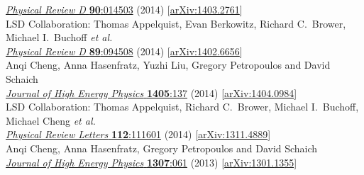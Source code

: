 \begin{spacelist}
\begin{revnumerate}
      \href{http://dx.doi.org/10.1103/PhysRevD.90.014503}{\textit{Physical Review D} \textbf{90}:014503} (2014) [\href{http://arxiv.org/abs/1403.2761}{arXiv:1403.2761}]%
    \pagebreakitem
       \\
      LSD Collaboration: Thomas Appelquist, Evan Berkowitz, Richard C.~Brower, Michael I.~Buchoff \textit{et al.} \\ %
      \href{http://dx.doi.org/10.1103/PhysRevD.89.094508}{\textit{Physical Review D} \textbf{89}:094508} (2014) [\href{http://arxiv.org/abs/1402.6656}{arXiv:1402.6656}]
    \pagebreakitem
       \\
      Anqi Cheng, Anna Hasenfratz, Yuzhi Liu, Gregory Petropoulos and David Schaich \\
      \href{http://dx.doi.org/10.1007/JHEP05(2014)137}{\textit{Journal of High Energy Physics} \textbf{1405}:137} (2014) [\href{http://arxiv.org/abs/1404.0984}{arXiv:1404.0984}]
    \pagebreakitem
       \\
      LSD Collaboration: Thomas Appelquist, Richard C.~Brower, Michael I.~Buchoff, Michael Cheng \textit{et al.} \\ %
      \href{http://dx.doi.org/10.1103/PhysRevLett.112.111601}{\textit{Physical Review Letters} \textbf{112}:111601} (2014) [\href{http://arxiv.org/abs/1311.4889}{arXiv:1311.4889}]
    \pagebreakitem
       \\
      Anqi Cheng, Anna Hasenfratz, Gregory Petropoulos and David Schaich \\
      \href{http://dx.doi.org/10.1007/JHEP07(2013)061}{\textit{Journal of High Energy Physics} \textbf{1307}:061} (2013) [\href{http://arxiv.org/abs/1301.1355}{arXiv:1301.1355}]
    \pagebreakitem
       \\

\end{revnumerate}
\end{spacelist}
